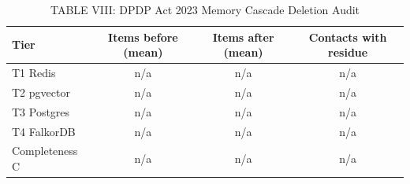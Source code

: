 \begin{table}[t]
\centering
\caption{TABLE VIII: DPDP Act 2023 Memory Cascade Deletion Audit}
\label{tab:erasure_audit}
\begin{tabular}{lccc}
\toprule
Tier & Items before (mean) & Items after (mean) & Contacts with residue \\
\midrule
T1 Redis & n/a & n/a & n/a \\
T2 pgvector & n/a & n/a & n/a \\
T3 Postgres & n/a & n/a & n/a \\
T4 FalkorDB & n/a & n/a & n/a \\
\midrule
Completeness C & n/a & n/a & n/a \\
\bottomrule
\end{tabular}
\end{table}